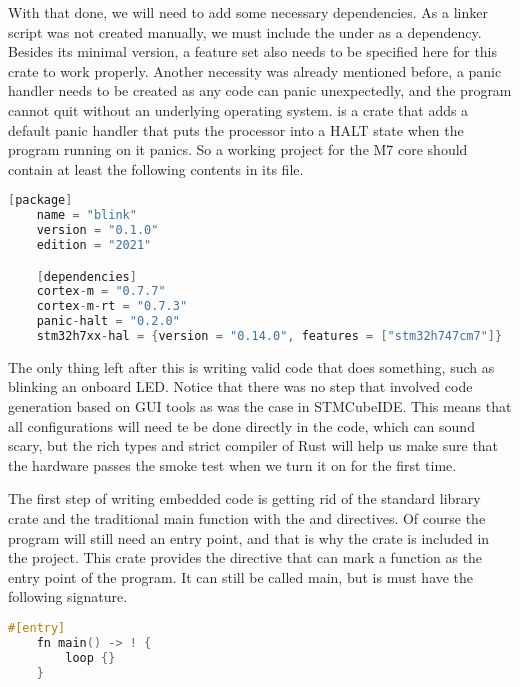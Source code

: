 With that done, we will need to add some necessary dependencies. As a  linker script was not created manually, we must include the  under as a dependency. Besides its minimal version, a feature set also needs to be specified here for this crate to work properly. Another necessity was already mentioned before, a panic handler needs to be created as any code can panic unexpectedly, and the program cannot quit without an underlying operating system.  is a crate that adds a default panic handler that puts the processor into a HALT state when the program running on it panics. So a working project for the M7 core should contain at least the following contents in its  file.

\begin{lstlisting}[language=C,frame=single,float=!ht,label={lst:cargo-toml},caption={Cargo.toml File of the Project}]
    [package]
    name = "blink"
    version = "0.1.0"
    edition = "2021"

    [dependencies]
    cortex-m = "0.7.7"
    cortex-m-rt = "0.7.3"
    panic-halt = "0.2.0"
    stm32h7xx-hal = {version = "0.14.0", features = ["stm32h747cm7"]}
\end{lstlisting}

The only thing left after this is writing valid code that does something, such as blinking an onboard LED. Notice that there was no step that involved code generation based on GUI tools as was the case in STMCubeIDE. This means that all configurations will need te be done directly in the code, which can sound scary, but the rich types and strict compiler of Rust will help us make sure that the hardware passes the smoke test when we turn it on for the first time.

The first step of writing embedded code is getting rid of the standard library crate and the traditional main function with the \mycode{#![no_std]} and \mycode{#![no_main]} directives. Of course the program will still need an entry point, and that is why the  crate is included in the project. This crate provides the \mycode{#[entry]} directive that can mark a function as the entry point of the program. It can still be called main, but is must have the following signature.

\begin{lstlisting}[language=C,frame=single,float=!ht,label={lst:embedded-main},caption={Main Function in Embedded Rust}]
    #[entry]
    fn main() -> ! {
        loop {}
    }
\end{lstlisting}

